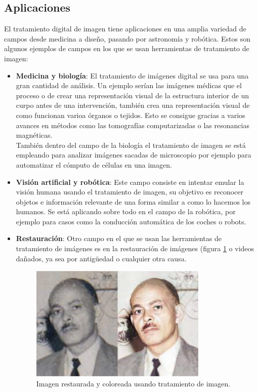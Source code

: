 \documentclass[a4paper,12pt]{report}
\begin{document}
\subsection{Aplicaciones}
El tratamiento digital de imagen tiene aplicaciones en una amplia variedad de campos desde medicina a diseño, pasando por astronomía y robótica.  Estos son algunos ejemplos de campos en los que se usan herramientas de tratamiento de imagen:
\begin{itemize}
\item \textbf{Medicina y biología}: El tratamiento de imágenes digital se usa para una gran cantidad de análisis. Un ejemplo serían las imágenes médicas que el proceso o de crear una representación visual de la estructura interior de un curpo antes de una intervención, también crea una representación visual de como funcionan varioa órganos o tejidos. Esto se consigue gracias a varios avances en métodos como las tomografías computarizadas o las resonancias magnéticas.\\

También dentro del campo de la biología el tratamiento de imagen se está empleando para analizar imágenes sacadas de microscopio por ejemplo para automatizar el cómputo de células en una imagen.\\

\item \textbf{Visión artificial y robótica}: Este campo consiste en intentar emular la visión humana usando el tratamiento de imagen, su objetivo es reconocer objetos e información relevante de una forma similar a como lo hacemos los humanos. Se está aplicando sobre todo en el campo de la robótica, por ejemplo para casos como la conducción automática de los coches o robots.
\item \textbf{Restauración}: Otro campo en el que se usan las herramientas de tratamiento de imágenes es en la restauración de imágenes (figura \ref{restauracion} o videos dañados, ya sea por antigüedad o cualquier otra causa. \\

\begin{figure}[h]
\centering
\includegraphics[width=0.8\textwidth]{imagenes/restauracion}
\caption{Imagen restaurada y coloreada usando tratamiento de imagen.}
\label{restauracion}
\end{figure}


\end{itemize}
\end{document}
